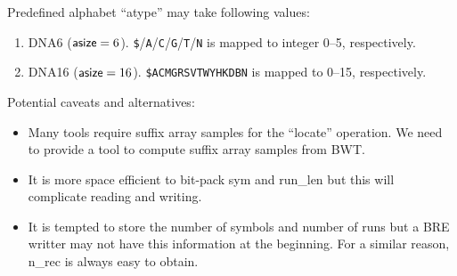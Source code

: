 \documentclass[10pt]{article}
\begin{document}
{\small
Predefined alphabet ``{\sf atype}'' may take following values:
\begin{enumerate}
\item {\sf DNA6} (${\sf asize}=6$). {\tt \$}/{\tt A}/{\tt C}/{\tt G}/{\tt T}/{\tt N} is mapped to integer 0--5, respectively.
\item {\sf DNA16} (${\sf asize}=16$). {\tt \$ACMGRSVTWYHKDBN} is mapped to 0--15, respectively.
\end{enumerate}

Potential caveats and alternatives:
\begin{itemize}
\item Many tools require suffix array samples for the ``locate'' operation.
  We need to provide a tool to compute suffix array samples from BWT.
\item It is more space efficient to bit-pack {\sf sym} and {\sf run\_len} but this will complicate reading and writing.
\item It is tempted to store the number of symbols and number of runs but a BRE writter may not have this information at the beginning.
  For a similar reason, {\sf n\_rec} is always easy to obtain.
\end{itemize}
}
\end{document}
